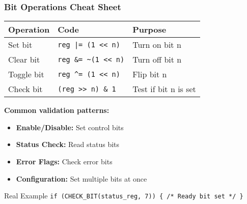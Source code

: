 \documentclass{beamer}
\begin{document}
\begin{frame}
\frametitle{Bit Operations Cheat Sheet}
\begin{center}
    \footnotesize
\begin{tabular}{|l|l|l|}
\hline
\textbf{Operation} & \textbf{Code} & \textbf{Purpose} \\
\hline
Set bit & \texttt{reg |= (1 << n)} & Turn on bit n \\
Clear bit & \texttt{reg \&= \textasciitilde(1 << n)} & Turn off bit n \\
Toggle bit & \texttt{reg \textasciicircum= (1 << n)} & Flip bit n \\
Check bit & \texttt{(reg >> n) \& 1} & Test if bit n is set \\
\hline
\end{tabular}
\end{center}

\vspace{0.2cm}

{\footnotesize\textbf{Common validation patterns:}
\begin{itemize}
    \item\footnotesize\textbf{Enable/Disable:} Set control bits
    \item\footnotesize\textbf{Status Check:} Read status bits
    \item\footnotesize\textbf{Error Flags:} Check error bits
    \item\footnotesize\textbf{Configuration:} Set multiple bits at once
\end{itemize}}

\vspace{0.2cm}
\begin{exampleblock}{Real Example}
\footnotesize\texttt{if (CHECK\_BIT(status\_reg, 7)) \{ /* Ready bit set */ \}}
\end{exampleblock}
\end{frame}
\end{document}
